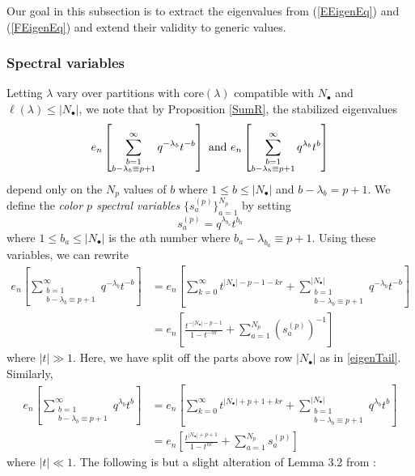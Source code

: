 \documentclass{amsart}
\newcommand{\core}{\mathrm{core}}
\theoremstyle{remark}
\numberwithin{thm}{section}
\numberwithin{equation}{section}
\begin{document}
Our goal in this subsection is to extract the eigenvalues from (\ref{EEigenEq}) and (\ref{FEigenEq}) and extend their validity to generic values.

\subsubsection{Spectral variables}
Letting $\lambda$ vary over partitions with $\core(\lambda)$ compatible with $N_\bullet$ and $\ell(\lambda)\le |N_\bullet|$, we note that by Proposition \ref{SumR}, the stabilized eigenvalues
\[
e_n\left[\sum_{\substack{b=1\\b-\lambda_b\equiv p+1}}^\infty q^{-\lambda_b}t^{-b}\right]
\hbox{ and }
e_n\left[\sum_{\substack{b=1\\b-\lambda_b\equiv p+1}}^\infty q^{\lambda_b} t^{b}\right]
\]
depend only on the $N_p$ values of $b$ where $1\le b\le |N_\bullet|$ and $b-\lambda_b=p+1$.
We define the \textit{color $p$ spectral variables} $\{ s^{(p)}_{ a} \}_{a=1}^{N_p}$ by setting
\[
s^{(p)}_{a}=q^{\lambda_{b_a}}t^{b_a}
\]
where $1\le b_a\le|N_\bullet|$ is the $a$th number where $b_a-\lambda_{b_a}\equiv p+1$.
Using these variables, we can rewrite
\begin{align*}
 e_n\left[\sum_{\substack{b=1\\b-\lambda_b\equiv p+1}}^\infty q^{-\lambda_b}t^{-b}\right]
&=e_n\left[\sum_{k=0}^{\infty}t^{|N_\bullet|-p-1-kr}+\sum_{\substack{b=1\\b-\lambda_b\equiv p+1}}^{|N_\bullet|} q^{-\lambda_b}t^{-b}\right]\\
&=e_n\left[\frac{t^{-|N_\bullet|-p-1}}{1-t^{-nr}}+\sum_{a=1}^{N_p}\left(s^{(p)}_{a}\right)^{-1} \right]   
\end{align*}
where $|t|\gg 1$.
Here, we have split off the parts above row $|N_\bullet|$ as in \eqref{eigenTail}.
Similarly,
\begin{align*}
e_n\left[\sum_{\substack{b=1\\b-\lambda_b\equiv p+1}}^\infty q^{\lambda_b} t^{b}\right]
&=e_n\left[\sum_{k=0}^\infty t^{|N_\bullet|+p+1+kr}+\sum_{\substack{b=1\\b-\lambda_b\equiv p+1}}^{|N_\bullet|} q^{\lambda_b} t^{b}\right]\\
&=e_n\left[ \frac{t^{|N_\bullet|+p+1}}{1-t^{nr}}+\sum_{a=1}^{N_p}s^{(p)}_{a} \right]   
\end{align*}
where $|t|\ll 1$.
The following is but a slight alteration of Lemma 3.2 from \cite{FHHSY}:
\end{document}
